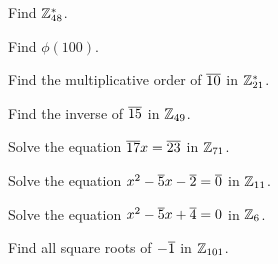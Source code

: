 \documentclass{amsart}
\begin{document}
\begin{Exc}
Find $\mathbb{Z}_{48}^*$.
\end{Exc}

\begin{Exc}
Find $\phi(100)$.
\end{Exc}

\begin{Exc}
Find the multiplicative order of $\overline{10}$ in $\mathbb{Z}_{21}^*$.
\end{Exc}

\begin{Exc}
Find the inverse of $\overline{15}$ in $\mathbb{Z}_{49}$.
\end{Exc}

\begin{Exc}
Solve the equation $\overline{17}x = \overline{23}$ in $\mathbb{Z}_{71}$.
\end{Exc}

\begin{Exc}
Solve the equation $x^2 - \overline{5}x - \overline{2} = \overline{0}$ in $\mathbb{Z}_{11}$.
\end{Exc}

\begin{Exc}
Solve the equation $x^2 - \overline{5}x + \overline{4} = 0$ in $\mathbb{Z}_{6}$.
\end{Exc}

\begin{Exc}
Find all square roots of $-\overline{1}$ in $\mathbb{Z}_{101}$.
\end{Exc}
\end{document}
